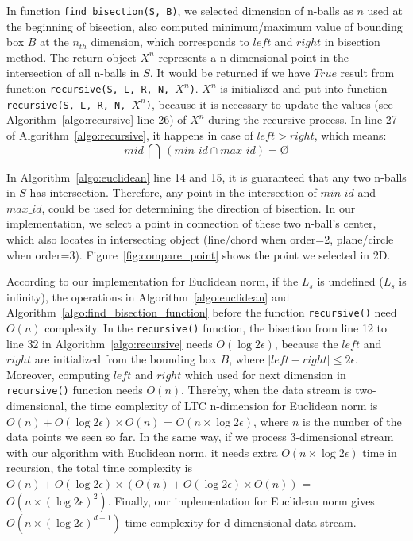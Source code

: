 In function \texttt{find\_bisection(S, B)}, we selected dimension of n-balls as
$n$ used at the beginning of bisection, also computed minimum/maximum value of
bounding box $B$ at the $n_{th}$ dimension, which corresponds to $left$ and
$right$ in bisection method. The return object $X^n$ represents a n-dimensional
point in the intersection of all n-balls in $S$. It would be returned if we have
$True$ result from function \texttt{recursive(S, L, R, N, $X^n$)}. $X^n$ is
initialized and put into function \texttt{recursive(S, L, R, N, $X^n$)}, because
it is necessary to update the values (see Algorithm~\ref{algo:recursive} line
26) of $X^n$ during the recursive process. In line 27 of
Algorithm~\ref{algo:recursive}, it happens in case of $left > right$, which
means:
\begin{equation*}
    mid \  \bigcap \  (min\_id \cap max\_id) = \text{\O}
\end{equation*}

In Algorithm~\ref{algo:euclidean} line 14 and 15, it is guaranteed that any two
n-balls in $S$ has intersection. Therefore, any point in the intersection of
$min\_id$ and $max\_id$, could be used for determining the direction of
bisection. In our implementation, we select a point in connection of these two
n-ball's center, which also locates in intersecting object (line/chord when
order=2, plane/circle when order=3). Figure~\ref{fig:compare_point} shows the
point we selected in 2D.

According to our implementation for Euclidean norm, if the $L_s$ is undefined
($L_s$ is infinity), the operations in Algorithm~\ref{algo:euclidean} and
Algorithm~\ref{algo:find_bisection_function} before the function
\texttt{recursive()} need $O(n)$ complexity. In the \texttt{recursive()}
function, the bisection from line 12 to line 32 in
Algorithm~\ref{algo:recursive} needs $O(\log{2\epsilon})$, because the $left$
and $right$ are initialized from the bounding box $B$, where $|left - right|
\leqslant 2\epsilon$. Moreover, computing $left$ and $right$ which used for next
dimension in \texttt{recursive()} function needs $O(n)$. Thereby, when the data
stream is two-dimensional, the time complexity of LTC n-dimension for Euclidean
norm is $O(n) + O(\log{2\epsilon})\times O(n)$ = $O(n \times \log{2\epsilon})$,
where $n$ is the number of the data points we seen so far. In the same way, if
we process 3-dimensional stream with our algorithm with Euclidean norm, it needs
extra $O(n \times \log{2\epsilon})$ time in recursion, the total time complexity
is $O(n) + O(\log{2\epsilon})\times (O(n) + O(\log{2\epsilon})\times O(n))$ =
$O(n\times(\log{2\epsilon})^{2})$. Finally, our implementation for Euclidean
norm gives $O(n\times(\log{2\epsilon})^{d-1})$ time complexity for d-dimensional
data stream.


